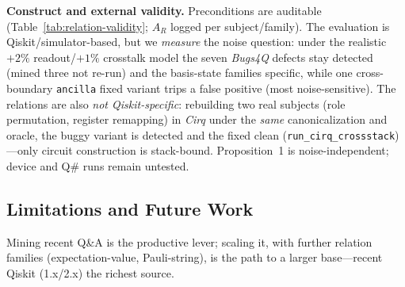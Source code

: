 \textbf{Construct and external validity.} Preconditions are auditable (Table~\ref{tab:relation-validity}; $A_R$ logged per subject/family). The evaluation is Qiskit/simulator-based, but we \emph{measure} the noise question: under the realistic $+2\%$ readout/$+1\%$ crosstalk model the seven \emph{Bugs4Q} defects stay detected (mined three not re-run) and the basis-state families specific, while one cross-boundary \texttt{ancilla} fixed variant trips a false positive (most noise-sensitive). The relations are also \emph{not Qiskit-specific}: rebuilding two real subjects (role permutation, register remapping) in \emph{Cirq} under the \emph{same} canonicalization and oracle, the buggy variant is detected and the fixed clean (\texttt{run\_cirq\_crossstack})---only circuit construction is stack-bound. Proposition~1 is noise-independent; device and Q\# runs remain untested.

\subsection{Limitations and Future Work}

Mining recent Q\&A is the productive lever; scaling it, with further relation families (expectation-value, Pauli-string), is the path to a larger base---recent Qiskit (1.x/2.x) the richest source.
